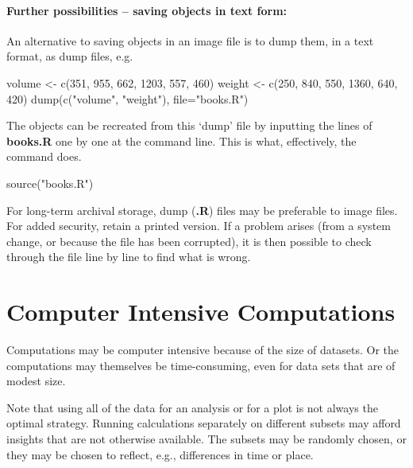 \paragraph{Further possibilities -- saving objects in text form:}
An alternative to saving objects in an
image file is to dump them, in a text format, as dump files, e.g.
\begin{Schunk}
\begin{Sinput}
volume <- c(351, 955, 662, 1203, 557, 460)
weight <- c(250, 840, 550, 1360, 640, 420)
dump(c("volume", "weight"), file="books.R")
\end{Sinput}
\end{Schunk}
The objects can be recreated
 from this `dump' file by inputting the
lines of \textbf{books.R} one by one at the command line. This is what,
effectively, the command  does.
\begin{Schunk}
\begin{Sinput}
source("books.R")
\end{Sinput}
\end{Schunk}

For long-term archival storage, dump (\textbf{.R}) files may be
preferable to image files.  For added security, retain a printed
version.  If a problem arises (from a system change, or because the
file has been corrupted), it is then possible to check through the
file line by line to find what is wrong.

\section{Computer Intensive Computations}\label{sec:large-dset}
Computations may be computer intensive because of the size of
datasets.  Or the computations may themselves be time-consuming, 
even for data sets that are of modest size.

Note that using all of the data for an analysis or for a plot is not
always the optimal strategy.  Running calculations separately on
different subsets may afford insights that are not otherwise
available. The subsets may be randomly chosen, or they may be chosen
to reflect, e.g., differences in time or place.

